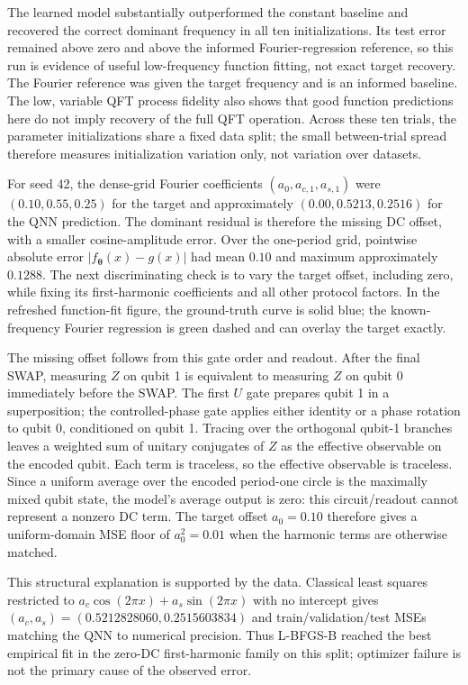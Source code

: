 \documentclass[11pt]{article}
\begin{document}
The learned model substantially outperformed the constant baseline and recovered the correct dominant frequency in all ten initializations. Its test error remained above zero and above the informed Fourier-regression reference, so this run is evidence of useful low-frequency function fitting, not exact target recovery. The Fourier reference was given the target frequency and is an informed baseline. The low, variable QFT process fidelity also shows that good function predictions here do not imply recovery of the full QFT operation. Across these ten trials, the parameter initializations share a fixed data split; the small between-trial spread therefore measures initialization variation only, not variation over datasets.

For seed 42, the dense-grid Fourier coefficients $(a_0,a_{c,1},a_{s,1})$ were $(0.10,0.55,0.25)$ for the target and approximately $(0.00,0.5213,0.2516)$ for the QNN prediction. The dominant residual is therefore the missing DC offset, with a smaller cosine-amplitude error. Over the one-period grid, pointwise absolute error $|f_{\boldsymbol{\theta}}(x)-g(x)|$ had mean $0.10$ and maximum approximately $0.1288$. The next discriminating check is to vary the target offset, including zero, while fixing its first-harmonic coefficients and all other protocol factors. In the refreshed function-fit figure, the ground-truth curve is solid blue; the known-frequency Fourier regression is green dashed and can overlay the target exactly.

The missing offset follows from this gate order and readout. After the final SWAP, measuring $Z$ on qubit 1 is equivalent to measuring $Z$ on qubit 0 immediately before the SWAP. The first $U$ gate prepares qubit 1 in a superposition; the controlled-phase gate applies either identity or a phase rotation to qubit 0, conditioned on qubit 1. Tracing over the orthogonal qubit-1 branches leaves a weighted sum of unitary conjugates of $Z$ as the effective observable on the encoded qubit. Each term is traceless, so the effective observable is traceless. Since a uniform average over the encoded period-one circle is the maximally mixed qubit state, the model's average output is zero: this circuit/readout cannot represent a nonzero DC term. The target offset $a_0=0.10$ therefore gives a uniform-domain MSE floor of $a_0^2=0.01$ when the harmonic terms are otherwise matched.

This structural explanation is supported by the data. Classical least squares restricted to $a_c\cos(2\pi x)+a_s\sin(2\pi x)$ with no intercept gives $(a_c,a_s)=(0.5212828060,0.2515603834)$ and train/validation/test MSEs matching the QNN to numerical precision. Thus L-BFGS-B reached the best empirical fit in the zero-DC first-harmonic family on this split; optimizer failure is not the primary cause of the observed error.
\end{document}
